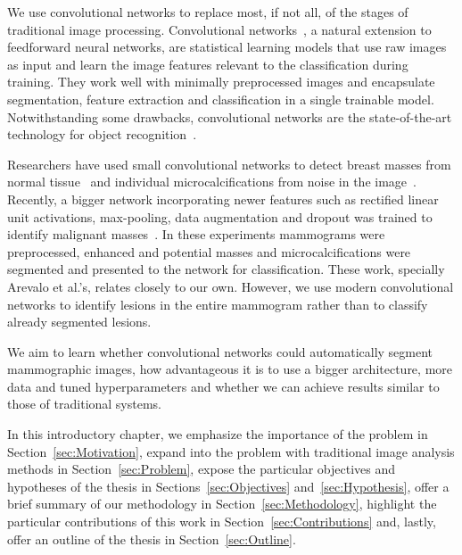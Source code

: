We use convolutional networks to replace most, if not all, of the stages of traditional image processing. 
Convolutional networks~\cite{Fukushima1980,LeCun1998}, a natural extension to feedforward neural networks, are statistical learning models that use raw images as input and learn the image features relevant to the classification during training. They work well with minimally preprocessed images and encapsulate segmentation, feature extraction and classification in a single trainable model. Notwithstanding some drawbacks, convolutional networks are the state-of-the-art technology for object recognition~\cite{Russakovsky2015}.

Researchers have used small convolutional networks to detect breast masses from normal tissue~\cite{Sahiner1996} and individual microcalcifications from noise in the image~\cite{Lo1995, Ge2007}. Recently, a bigger network incorporating newer features such as rectified linear unit activations, max-pooling, data augmentation and dropout was trained to identify malignant masses~\cite{Arevalo2015}. In these experiments mammograms were preprocessed, enhanced and potential masses and microcalcifications were segmented and presented to the network for classification.
These work, specially Arevalo et al.'s, relates closely to our own. However, we use modern convolutional networks to identify lesions in the entire mammogram rather than to classify already segmented lesions.

We aim to learn whether convolutional networks could automatically segment mammographic images, how advantageous it is to use a bigger architecture, more data and tuned hyperparameters and whether we can achieve results similar to those of traditional systems.

In this introductory chapter, we emphasize the importance of the problem in Section~\ref{sec:Motivation}, expand into the problem with traditional image analysis methods in Section~\ref{sec:Problem}, expose the particular objectives and hypotheses of the thesis in Sections~\ref{sec:Objectives} and~\ref{sec:Hypothesis}, offer a brief summary of our methodology in Section~\ref{sec:Methodology}, highlight the particular contributions of this work in Section~\ref{sec:Contributions} and, lastly, offer an outline of the thesis in Section~\ref{sec:Outline}.
